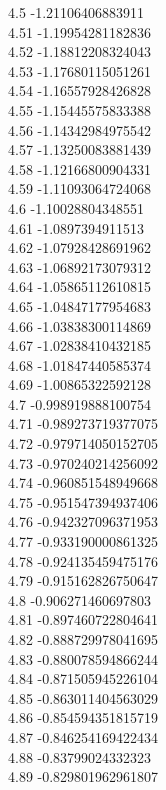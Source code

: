 {4.5	-1.21106406883911\\
4.51	-1.19954281182836\\
4.52	-1.18812208324043\\
4.53	-1.17680115051261\\
4.54	-1.16557928426828\\
4.55	-1.15445575833388\\
4.56	-1.14342984975542\\
4.57	-1.13250083881439\\
4.58	-1.12166800904331\\
4.59	-1.11093064724068\\
4.6	-1.10028804348551\\
4.61	-1.0897394911513\\
4.62	-1.07928428691962\\
4.63	-1.06892173079312\\
4.64	-1.05865112610815\\
4.65	-1.04847177954683\\
4.66	-1.03838300114869\\
4.67	-1.02838410432185\\
4.68	-1.01847440585374\\
4.69	-1.00865322592128\\
4.7	-0.998919888100754\\
4.71	-0.989273719377075\\
4.72	-0.979714050152705\\
4.73	-0.970240214256092\\
4.74	-0.960851548949668\\
4.75	-0.951547394937406\\
4.76	-0.942327096371953\\
4.77	-0.933190000861325\\
4.78	-0.924135459475176\\
4.79	-0.915162826750647\\
4.8	-0.906271460697803\\
4.81	-0.897460722804641\\
4.82	-0.888729978041695\\
4.83	-0.880078594866244\\
4.84	-0.871505945226104\\
4.85	-0.863011404563029\\
4.86	-0.854594351815719\\
4.87	-0.846254169422434\\
4.88	-0.83799024332323\\
4.89	-0.829801962961807\\
}
